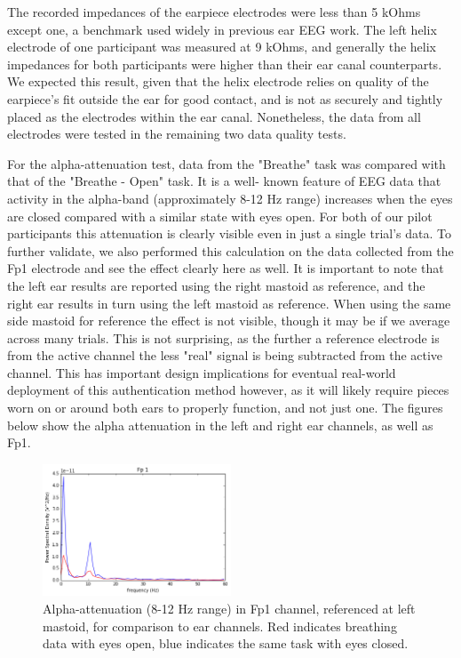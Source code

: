 \documentclass[11pt]{article}
\begin{document}
The recorded impedances of the earpiece electrodes were less than 5 kOhms except one, a benchmark used widely in previous
ear EEG work. The left helix electrode of one participant was measured at 9 kOhms, and generally the 
helix impedances for both participants were higher than their ear canal counterparts. We expected this result, given that the
helix electrode relies on quality of the earpiece's fit outside the ear for good contact, and is not as securely and tightly placed as the
electrodes within the ear canal. Nonetheless, the data from all electrodes were tested in the remaining two data quality tests.

For the alpha-attenuation test, data from the "Breathe" task was compared with that of the "Breathe - Open" task. It is a well-
known feature of EEG data that activity in the alpha-band (approximately 8-12 Hz range) increases when the eyes are closed
compared with a similar state with eyes open. For both of our pilot participants this attenuation is clearly visible even in just
a single trial's data. To further validate, we also performed this calculation on the data collected from the Fp1 electrode and see
the effect clearly here as well. It is important to note that the left ear results are reported using the right mastoid as reference, and
the right ear results in turn using the left mastoid as reference. When using the same side mastoid for reference the effect is not 
visible, though it may be if we average across many trials. This is not surprising, as the further a reference electrode is from the active
channel the less "real" signal is being subtracted from the active channel. This has important design implications for eventual 
real-world deployment of this authentication method however, as it will likely require pieces worn on or around both ears to properly 
function, and not just one. The figures below show the alpha attenuation in the left and right ear channels, as well as Fp1.

\begin{figure}[h]
\centering
\includegraphics[width=0.5\textwidth]{001_AlphaAtt_Fp1.jpg}
\caption{Alpha-attenuation (8-12 Hz range) in Fp1 channel, referenced at left mastoid, for comparison to ear channels. Red indicates breathing data with
eyes open, blue indicates the same task with eyes closed.}
\end{figure}
\end{document}
